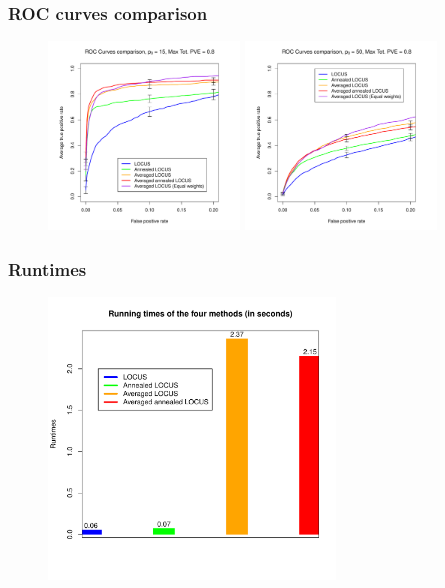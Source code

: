 \documentclass{beamer}
\begin{document}
\begin{frame}
\frametitle{ROC curves comparison}
\begin{figure}
\includegraphics[width=2in]{images/ROC_curves_w_equal_weight.pdf}
\includegraphics[width=2in]{images/ROC_curves_w_equal_weight_50.pdf}
\end{figure}
\end{frame}

\begin{frame}
\frametitle{Runtimes}
\begin{figure}
\includegraphics[width=3in]{images/runtimes.pdf}
\end{figure}
\end{frame}

\end{document}
